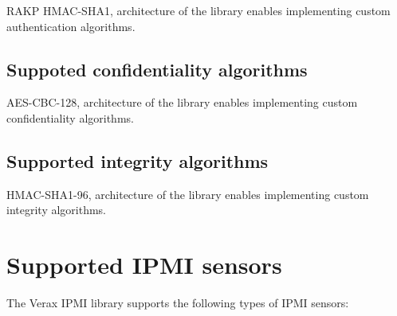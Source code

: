 \documentclass{article}
\begin{document}
RAKP HMAC-SHA1, architecture of the library enables implementing custom
authentication algorithms.

\subsection{Suppoted confidentiality algorithms}

AES-CBC-128, architecture of the library enables implementing custom
confidentiality algorithms.
\subsection{Supported integrity algorithms}

HMAC-SHA1-96, architecture of the library enables implementing custom integrity
algorithms.

\section{Supported IPMI sensors}

The Verax IPMI library supports the following types of IPMI sensors:
\end{document}
